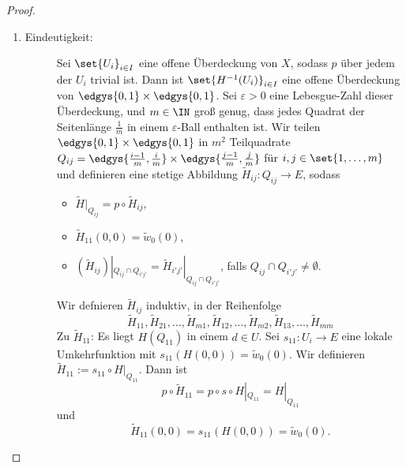 \documentclass[language=ngerman]{TemplateLecture} %
\begin{document}
\begin{proof}
    \begin{enumerate}[$(i)$:]
        \item \begin{description}
            \item[Eindeutigkeit:] Sei $\set{U_i}_{i \in I}$ eine offene Überdeckung von $X$, sodass $p$ über jedem der $U_i$ trivial ist. Dann ist $\set{H^{-1}(U_i)}_{i \in I}$ eine offene Überdeckung von $\edgys{0,1} \times \edgys{0,1}$. Sei $\varepsilon > 0$ eine Lebesgue-Zahl dieser Überdeckung, und $m \in \IN$ groß genug, dass jedes Quadrat der Seitenlänge $\frac{1}{m}$ in einem $\varepsilon$-Ball enthalten ist. 
            Wir teilen $\edgys{0,1} \times \edgys{0,1}$ in $m^2$ Teilquadrate $Q_{ij} = \edgys{\frac{i-1}{m}, \frac{i}{m}} \times \edgys{\frac{j-1}{m}, \frac{j}{m}}$ für $i, j \in \set{1, \ldots, m}$ und definieren eine stetige Abbildung $\tilde{H}_{ij} : Q_{ij} \to E$, sodass 
            \begin{itemize}
                \item $\tilde{H}|_{Q_{ij}} = p \circ \tilde{H}_{ij}$,
                \item $\tilde{H}_{11}(0,0) = \tilde{w}_0(0)$,
                \item $(\tilde{H}_{ij})|_{Q_{ij} \cap Q_{i' j'}} = {\tilde{H}_{i' j'}}|_{Q_{ij} \cap Q_{i' j'}}$, falls $Q_{ij} \cap Q_{i' j'} \neq \emptyset$.
            \end{itemize}
            Wir defnieren $\tilde{H}_{ij}$ induktiv, in der Reihenfolge 
            \begin{equation*}
                \tilde{H}_{11}, \tilde{H}_{21}, \ldots, \tilde{H}_{m1}, \tilde{H}_{12}, \ldots, \tilde{H}_{m2}, \tilde{H}_{13}, \ldots, \tilde{H}_{mm}
            \end{equation*}
            Zu $\tilde{H}_{11}$: Es liegt $H(Q_{11})$ in einem $d \in U$. Sei $s_{11}: U_i \to E$ eine lokale Umkehrfunktion mit $s_{11}(H(0,0)) = \tilde{w}_0(0)$. Wir definieren $\tilde{H}_{11} := s_{11} \circ H|_{Q_{11}}$. Dann ist 
            \begin{equation*}
                p \circ \tilde{H}_{11} = p \circ s \circ H|_{Q_{11}} = H|_{Q_{11}}
            \end{equation*}
            und 
            \begin{equation*}
                \tilde{H}_{11}(0,0) = s_{11}(H(0,0)) = \tilde{w}_0(0).
            \end{equation*}
            

\end{description}
\end{enumerate}
\end{proof}
\end{document}

